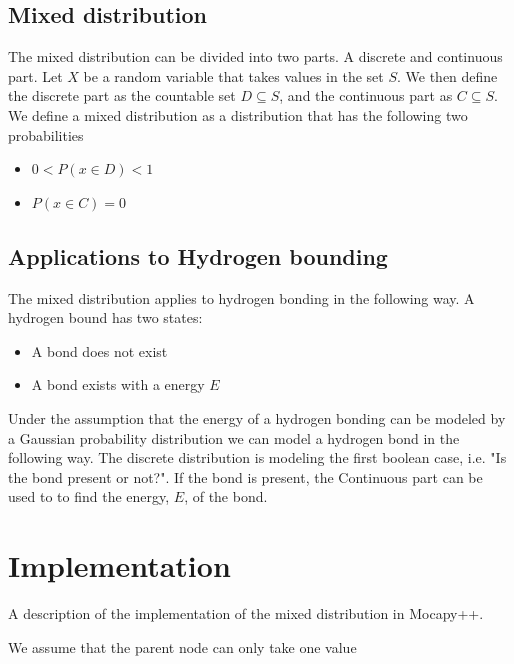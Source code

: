 \documentclass[10pt, conference, compsocconf,a4paper]{IEEEtran}
\begin{document}
\subsection{Mixed distribution} %
\label{sub:mixed_distribution}
The mixed distribution can be divided into two parts. A discrete and continuous part. Let $X$ be a random variable that takes values in the set $S$. We then define the discrete part as the countable set $D \subseteq S$, and the continuous part as $C \subseteq S$. We define a mixed distribution as a distribution that has the following two probabilities

\begin{itemize}
  \item $0 < P(x \in D) < 1$
  \item $P(x \in C) = 0$
\end{itemize} 

\subsection{Applications to Hydrogen bounding} %
\label{sub:applications_to_hydrogen_bounding}
The mixed distribution applies to hydrogen bonding in the following way. A hydrogen bound has two states:

\begin{itemize}
  \item A bond does not exist
  \item A bond exists with a energy $E$
\end{itemize}

Under the assumption that the energy of a hydrogen bonding can be modeled by a Gaussian probability distribution we can model a hydrogen bond in the following way. The discrete distribution is modeling the first boolean case, i.e. "Is the bond present or not?". If the bond is present, the Continuous part can be used to to find the energy, $E$, of the bond.




\section{Implementation} %
\label{sec:implementation}
A description of the implementation of the mixed distribution in Mocapy++. 

We assume that the parent node can only take one value
\end{document}
